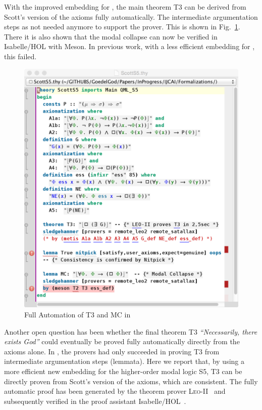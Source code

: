 \documentclass{article}
\begin{document}
With the improved embedding for \SFiveU, the main theorem T3 can be derived from Scott's version of the axioms fully automatically. The
intermediate argumentation steps as not needed anymore to support the
prover.  This is shown in Fig.~\ref{ScottS5}. There it is also shown that the modal collapse can now be verified in
Isabelle/HOL with Meson. In previous work, with a less efficient embedding for \SFive, this failed.
\begin{figure}
\centerline{\includegraphics[width=\columnwidth]{./Images/ScottS5.png}}
\caption{Full Automation of T3 and MC in \SFiveU } \label{ScottS5}
\end{figure}


Another open question has been whether the final theorem T3 \textit{``Necessarily, there
    exists God''} could eventually be proved fully automatically
  directly from the axioms alone. In , the provers had only succeeded in proving 
  T3 from intermediate argumentation steps (lemmata). Here we report that, by using a more efficient new
  embedding for the higher-order modal logic S5, T3 can be directly proven from Scott's version of the axioms, which are consistent. The fully automatic proof has been
  generated by the theorem prover \textsc{Leo-II}~\cite{C26} and
  subsequently verified in the proof assistant
  Isabelle/HOL~\cite{NPW02}.
\end{document}
